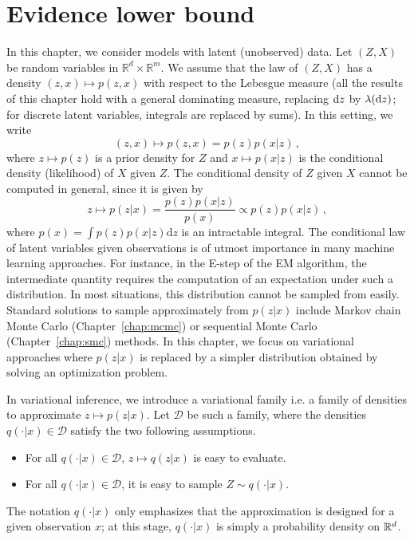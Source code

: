 \documentclass[english,graybox,envcountchap,envcountsame,sectrefs,shortlabels]{svmono}
\theoremstyle{style}
\begin{document}
\section{Evidence lower bound}
\label{sec:elbo}
In this chapter, we consider models with latent (unobserved) data. Let $(Z,X)$ be random variables in $\mathbb{R}^d\times \mathbb{R}^m$. We assume that the law of $(Z,X)$ has a density $(z,x)\mapsto p(z,x)$ with respect to the Lebesgue measure (all the results of this chapter hold with a general dominating measure, replacing $\mathrm{d} z$ by $\lambda(\mathrm{d} z)$; for discrete latent variables, integrals are replaced by sums). In this setting, we write
$$
(z,x)\mapsto p(z,x) = p(z)p(x|z)\,,
$$
where $z\mapsto p(z)$ is a prior density for $Z$ and $x \mapsto p(x|z)$ is the conditional density (likelihood) of $X$ given $Z$. The conditional density of $Z$ given $X$ cannot be computed in general, since it is given by
$$
z\mapsto p(z|x) = \frac{p(z)p(x|z)}{p(x)}\propto p(z)p(x|z)\,, 
$$
where $p(x) = \int p(z)p(x|z) \mathrm{d} z$ is an intractable integral. The conditional law of latent variables given observations is of utmost importance in many machine learning approaches. For instance, in the E-step of the EM algorithm, the intermediate quantity requires the computation of an expectation under such a distribution. In most situations, this distribution cannot be sampled from easily. Standard solutions to sample approximately from $p(z|x)$ include Markov chain Monte Carlo (Chapter~\ref{chap:mcmc}) or sequential Monte Carlo (Chapter~\ref{chap:smc}) methods. In this chapter, we focus on variational approaches where $p(z|x)$ is replaced by a simpler distribution obtained by solving an optimization problem.

\medskip

In variational inference, we introduce a variational family i.e. a family of densities to  approximate $z\mapsto p(z|x)$. Let $\mathcal{D}$ be such a family, where the densities $q(\cdot|x) \in\mathcal{D}$ satisfy the two following assumptions.
\begin{itemize}
\item For all $q(\cdot|x)\in \mathcal{D}$, $z\mapsto q(z|x)$ is easy to evaluate.
\item For all $q(\cdot|x)\in \mathcal{D}$, it is easy to sample $Z\sim q(\cdot|x)$.
\end{itemize}
The notation $q(\cdot|x)$ only emphasizes that the approximation is designed for a given observation $x$; at this stage, $q(\cdot|x)$ is simply a probability density on $\mathbb{R}^d$.
\end{document}
